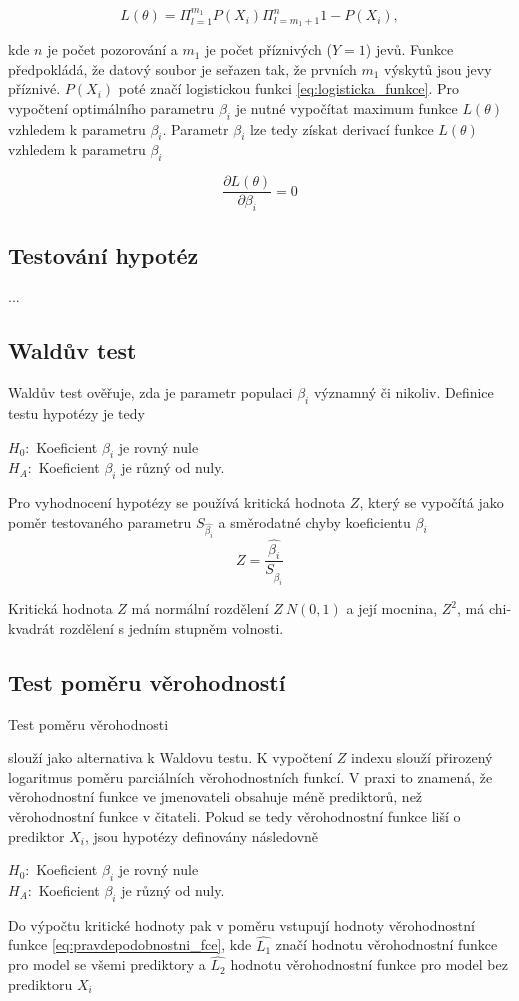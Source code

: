 \begin{equation}
    \label{eq:pravdepodobnostni_fce}
    L(\theta) = \Pi_{l = 1}^{m_1} P(X_i) \Pi_{l = m_1 + 1}^{n} 1 - P(X_i),
\end{equation}

kde $n$ je počet pozorování a $m_1$ je počet příznivých ($Y = 1$) jevů. Funkce předpokládá, že datový soubor je seřazen tak, že prvních $m_1$ výskytů
jsou jevy příznivé. $P(X_i)$ poté značí logistickou funkci \ref{eq:logisticka_funkce}. Pro vypočtení optimálního parametru $\beta_i$ je nutné vypočítat
maximum funkce $L(\theta)$ vzhledem k parametru $\beta_i$. Parametr $\beta_i$ lze tedy získat derivací funkce $L(\theta)$ vzhledem k parametru $\beta_i$

\begin{equation}
    \frac{\partial L(\theta)}{\partial \beta_i} = 0
\end{equation}

\subsection{Testování hypotéz}
...

\subsection{Waldův test}
{
Waldův test ověřuje, zda je parametr
populaci
}
 $\beta_i$ významný či nikoliv. Definice
testu hypotézy je tedy

$H_0:$ Koeficient $\beta_i$ je rovný nule \\
$H_A:$ Koeficient $\beta_i$ je různý od nuly.

{
Pro vyhodnocení hypotézy se používá kritická hodnota $Z$, který se vypočítá jako poměr testovaného parametru $S_{\hat{\beta_i}}$
a směrodatné chyby koeficientu $\beta_i$
}
\begin{equation}
    Z = \frac{\hat{\beta_i}}{S_{\hat{\beta_i}}}
\end{equation}

Kritická hodnota $Z$ má normální rozdělení $Z ~ N(0, 1)$ a její mocnina, $Z^2$, má chi-kvadrát rozdělení s jedním stupněm volnosti.

\subsection{Test poměru věrohodností}
Test poměru věrohodnosti 
{
slouží jako alternativa k Waldovu testu. K vypočtení $Z$ indexu slouží přirozený logaritmus poměru parciálních věrohodnostních funkcí.
V praxi to znamená, že věrohodnostní funkce ve jmenovateli obsahuje méně prediktorů, než věrohodnostní funkce v čitateli.
Pokud se tedy věrohodnostní funkce liší o prediktor $X_i$, jsou hypotézy definovány následovně

$H_0:$ Koeficient $\beta_i$ je rovný nule \\
$H_A:$ Koeficient $\beta_i$ je různý od nuly.

Do výpočtu kritické hodnoty pak v poměru vstupují hodnoty věrohodnostní funkce \ref{eq:pravdepodobnostni_fce}, kde 
$\hat{L_1}$ značí hodnotu věrohodnostní funkce pro model se všemi prediktory a $\hat{L_2}$ hodnotu věrohodnostní funkce pro model bez 
prediktoru $X_i$
}

